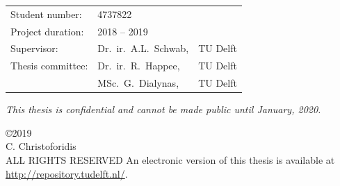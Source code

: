\begin{titlepage}
\begin{center}
    \vfill
    
    \begin{tabular}{lll}
        Student number: & 4737822 \\
        Project duration: & \multicolumn{2}{l}{ 2018 -- 2019} \\
        Supervisor: & Dr.\ ir.\ A.L.\ Schwab, & TU Delft \\
        Thesis committee:
            & Dr.\ ir.\ R.\ Happee, & TU Delft \\
            & MSc.\ G.\ Dialynas, & TU Delft \\
    \end{tabular}
    
    \bigskip
    \bigskip
    \emph{This thesis is confidential and cannot be made public until January, 2020.}
    
    \bigskip
    \bigskip
    \copyright2019\\
    C. Christoforidis\\
    ALL RIGHTS RESERVED
    An electronic version of this thesis is available at \url{http://repository.tudelft.nl/}.
    
    \end{center}
    
    \end{titlepage}
    
    